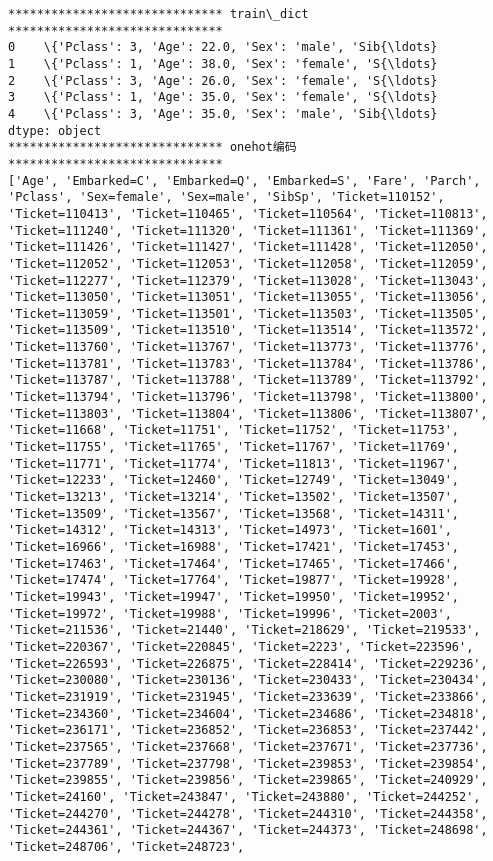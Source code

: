 \documentclass[11pt]{article}
\begin{document}
    \begin{Verbatim}[commandchars=\\\{\}]
****************************** train\_dict ******************************
0    \{'Pclass': 3, 'Age': 22.0, 'Sex': 'male', 'Sib{\ldots}
1    \{'Pclass': 1, 'Age': 38.0, 'Sex': 'female', 'S{\ldots}
2    \{'Pclass': 3, 'Age': 26.0, 'Sex': 'female', 'S{\ldots}
3    \{'Pclass': 1, 'Age': 35.0, 'Sex': 'female', 'S{\ldots}
4    \{'Pclass': 3, 'Age': 35.0, 'Sex': 'male', 'Sib{\ldots}
dtype: object
****************************** onehot编码 ******************************
['Age', 'Embarked=C', 'Embarked=Q', 'Embarked=S', 'Fare', 'Parch', 'Pclass', 'Sex=female', 'Sex=male', 'SibSp', 'Ticket=110152', 'Ticket=110413', 'Ticket=110465', 'Ticket=110564', 'Ticket=110813', 'Ticket=111240', 'Ticket=111320', 'Ticket=111361', 'Ticket=111369', 'Ticket=111426', 'Ticket=111427', 'Ticket=111428', 'Ticket=112050', 'Ticket=112052', 'Ticket=112053', 'Ticket=112058', 'Ticket=112059', 'Ticket=112277', 'Ticket=112379', 'Ticket=113028', 'Ticket=113043', 'Ticket=113050', 'Ticket=113051', 'Ticket=113055', 'Ticket=113056', 'Ticket=113059', 'Ticket=113501', 'Ticket=113503', 'Ticket=113505', 'Ticket=113509', 'Ticket=113510', 'Ticket=113514', 'Ticket=113572', 'Ticket=113760', 'Ticket=113767', 'Ticket=113773', 'Ticket=113776', 'Ticket=113781', 'Ticket=113783', 'Ticket=113784', 'Ticket=113786', 'Ticket=113787', 'Ticket=113788', 'Ticket=113789', 'Ticket=113792', 'Ticket=113794', 'Ticket=113796', 'Ticket=113798', 'Ticket=113800', 'Ticket=113803', 'Ticket=113804', 'Ticket=113806', 'Ticket=113807', 'Ticket=11668', 'Ticket=11751', 'Ticket=11752', 'Ticket=11753', 'Ticket=11755', 'Ticket=11765', 'Ticket=11767', 'Ticket=11769', 'Ticket=11771', 'Ticket=11774', 'Ticket=11813', 'Ticket=11967', 'Ticket=12233', 'Ticket=12460', 'Ticket=12749', 'Ticket=13049', 'Ticket=13213', 'Ticket=13214', 'Ticket=13502', 'Ticket=13507', 'Ticket=13509', 'Ticket=13567', 'Ticket=13568', 'Ticket=14311', 'Ticket=14312', 'Ticket=14313', 'Ticket=14973', 'Ticket=1601', 'Ticket=16966', 'Ticket=16988', 'Ticket=17421', 'Ticket=17453', 'Ticket=17463', 'Ticket=17464', 'Ticket=17465', 'Ticket=17466', 'Ticket=17474', 'Ticket=17764', 'Ticket=19877', 'Ticket=19928', 'Ticket=19943', 'Ticket=19947', 'Ticket=19950', 'Ticket=19952', 'Ticket=19972', 'Ticket=19988', 'Ticket=19996', 'Ticket=2003', 'Ticket=211536', 'Ticket=21440', 'Ticket=218629', 'Ticket=219533', 'Ticket=220367', 'Ticket=220845', 'Ticket=2223', 'Ticket=223596', 'Ticket=226593', 'Ticket=226875', 'Ticket=228414', 'Ticket=229236', 'Ticket=230080', 'Ticket=230136', 'Ticket=230433', 'Ticket=230434', 'Ticket=231919', 'Ticket=231945', 'Ticket=233639', 'Ticket=233866', 'Ticket=234360', 'Ticket=234604', 'Ticket=234686', 'Ticket=234818', 'Ticket=236171', 'Ticket=236852', 'Ticket=236853', 'Ticket=237442', 'Ticket=237565', 'Ticket=237668', 'Ticket=237671', 'Ticket=237736', 'Ticket=237789', 'Ticket=237798', 'Ticket=239853', 'Ticket=239854', 'Ticket=239855', 'Ticket=239856', 'Ticket=239865', 'Ticket=240929', 'Ticket=24160', 'Ticket=243847', 'Ticket=243880', 'Ticket=244252', 'Ticket=244270', 'Ticket=244278', 'Ticket=244310', 'Ticket=244358', 'Ticket=244361', 'Ticket=244367', 'Ticket=244373', 'Ticket=248698', 'Ticket=248706', 'Ticket=248723', 
\end{Verbatim}
\end{document}

